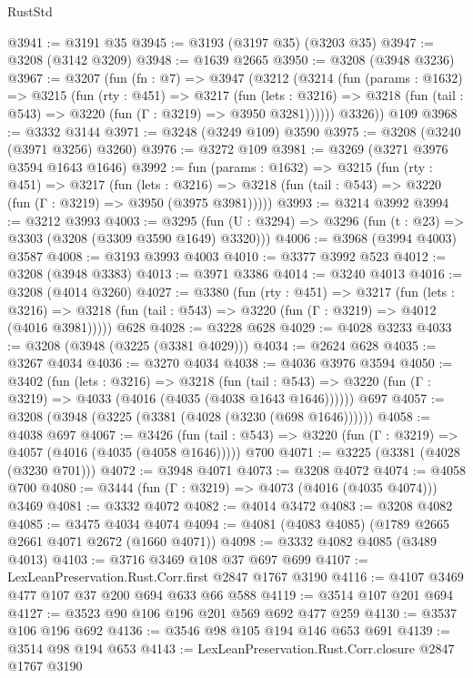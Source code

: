 \begin{lexlean}{RustStd}
\begin{coremodule}
@3941 := @3191 @35
@3945 := @3193 (@3197 @35) (@3203 @35)
@3947 := @3208 (@3142 @3209)
@3948 := @1639 @2665
@3950 := @3208 (@3948 @3236)
@3967 := @3207
    (fun (fn : @7) =>
    @3947
      (@3212
        (@3214
          (fun (params : @1632) =>
          @3215
            (fun (rty : @451) =>
            @3217
              (fun (lets : @3216) =>
              @3218 (fun (tail : @543) => @3220 (fun (Γ : @3219) => @3950 @3281))))))
        @3326))
    @109
@3968 := @3332 @3144
@3971 := @3248 (@3249 @109) @3590
@3975 := @3208 (@3240 (@3971 @3256) @3260)
@3976 := @3272 @109
@3981 := @3269 (@3271 @3976 @3594 @1643 @1646)
@3992 := fun (params : @1632) =>
  @3215
    (fun (rty : @451) =>
    @3217
      (fun (lets : @3216) =>
      @3218 (fun (tail : @543) => @3220 (fun (Γ : @3219) => @3950 (@3975 @3981)))))
@3993 := @3214 @3992
@3994 := @3212 @3993
@4003 := @3295 (fun (U : @3294) => @3296 (fun (t : @23) => @3303 (@3208 (@3309 @3590 @1649) @3320)))
@4006 := @3968 (@3994 @4003) @3587
@4008 := @3193 @3993 @4003
@4010 := @3377 @3992 @523
@4012 := @3208 (@3948 @3383)
@4013 := @3971 @3386
@4014 := @3240 @4013
@4016 := @3208 (@4014 @3260)
@4027 := @3380
    (fun (rty : @451) =>
    @3217
      (fun (lets : @3216) =>
      @3218 (fun (tail : @543) => @3220 (fun (Γ : @3219) => @4012 (@4016 @3981)))))
    @628
@4028 := @3228 @628
@4029 := @4028 @3233
@4033 := @3208 (@3948 (@3225 (@3381 @4029)))
@4034 := @2624 @628
@4035 := @3267 @4034
@4036 := @3270 @4034
@4038 := @4036 @3976 @3594
@4050 := @3402
    (fun (lets : @3216) =>
    @3218
      (fun (tail : @543) => @3220 (fun (Γ : @3219) => @4033 (@4016 (@4035 (@4038 @1643 @1646))))))
    @697
@4057 := @3208 (@3948 (@3225 (@3381 (@4028 (@3230 (@698 @1646))))))
@4058 := @4038 @697
@4067 := @3426
    (fun (tail : @543) => @3220 (fun (Γ : @3219) => @4057 (@4016 (@4035 (@4058 @1646)))))
    @700
@4071 := @3225 (@3381 (@4028 (@3230 @701)))
@4072 := @3948 @4071
@4073 := @3208 @4072
@4074 := @4058 @700
@4080 := @3444 (fun (Γ : @3219) => @4073 (@4016 (@4035 @4074))) @3469
@4081 := @3332 @4072
@4082 := @4014 @3472
@4083 := @3208 @4082
@4085 := @3475 @4034 @4074
@4094 := @4081 (@4083 @4085) (@1789 @2665 @2661 @4071 @2672 (@1660 @4071))
@4098 := @3332 @4082 @4085 (@3489 @4013)
@4103 := @3716 @3469 @108 @37 @697 @699
@4107 := LexLeanPreservation.Rust.Corr.first @2847 @1767 @3190
@4116 := @4107 @3469 @477 @107 @37 @200 @694 @633 @66 @588
@4119 := @3514 @107 @201 @694
@4127 := @3523 @90 @106 @196 @201 @569 @692 @477 @259
@4130 := @3537 @106 @196 @692
@4136 := @3546 @98 @105 @194 @146 @653 @691
@4139 := @3514 @98 @194 @653
@4143 := LexLeanPreservation.Rust.Corr.closure @2847 @1767 @3190

\end{coremodule}
\end{lexlean}
